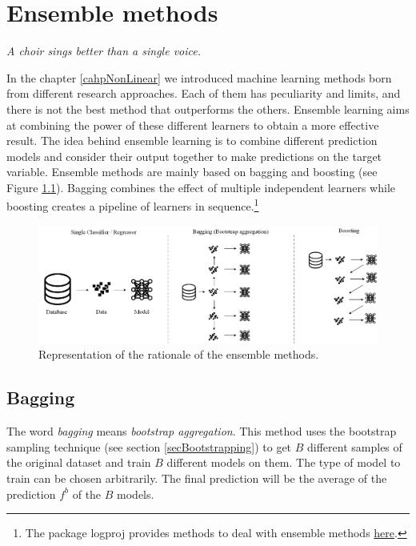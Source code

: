 \chapter{Ensemble methods} \label{cahpEnsemble}

\epigraph{\textit{A choir sings better than a single voice.}}{}


In the chapter \ref{cahpNonLinear} we introduced machine learning methods born from different research approaches. Each of them has peculiarity and limits, and there is not the best method that outperforms the others. Ensemble learning aims at combining the power of these different learners to obtain a more effective result. The idea behind ensemble learning is to combine different prediction models and consider their output together to make predictions on the target variable. Ensemble methods are mainly based on bagging and boosting (see Figure \ref{fig_ensemble}). Bagging combines the effect of multiple independent learners while boosting creates a pipeline of learners in sequence.\footnote{The package logproj provides methods to deal with ensemble methods \href{https://github.com/aletuf93/logproj/blob/master/logproj/M_learningMethod/ensemble_methods.py}{here}.}

\begin{figure}[hbt!]
\centering
\includegraphics[width=1\textwidth]{SectionLetsMath/ensembleMethods_fig/fig_ensemble.png}
\captionsetup{type=figure}
\caption{Representation of the rationale of the ensemble methods.}
\label{fig_ensemble}
\end{figure}

\section{Bagging}
The word \textit{bagging} means \textit{bootstrap aggregation}. This method uses the bootstrap sampling technique (see section \ref{secBootstrapping}) to get $B$ different samples of the original dataset and train $B$ different models on them. The type of model to train can be chosen arbitrarily. The final prediction will be the average of the prediction $f^b$ of the $B$ models.

